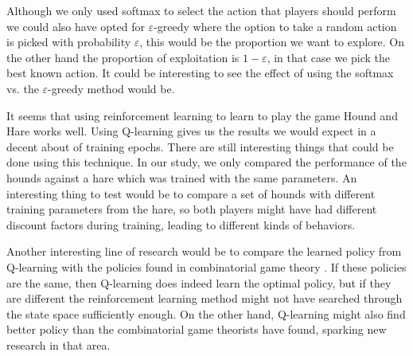 Although we only used softmax to select the action that players should perform
we could also have opted for $\varepsilon$-greedy where the option to take a
random action is picked with probability $\varepsilon$, this would be the
proportion we want to explore. On the other hand the proportion of exploitation
is $1-\varepsilon$, in that case we pick the best known action. It could be
interesting to see the effect of using the softmax vs. the $\varepsilon$-greedy
method would be.

It seems that using reinforcement learning to learn to play the game Hound and
Hare works well. Using Q-learning gives us the results we would expect in
a decent about of training epochs. There are still interesting things that
could be done using this technique. In our study, we only compared the
performance of the hounds against a hare which was trained with the same
parameters. An interesting thing to test would be to compare a set of
hounds with different training parameters from the hare, so both players
might have had different discount factors during training, leading to
different kinds of behaviors.

Another interesting line of research would be to compare the learned policy
from Q-learning with the policies found in combinatorial game theory
\cite{gardner1961second, siegel2005coping}. If these policies are the same,
then Q-learning does indeed learn the optimal policy, but if they are
different the reinforcement learning method might not have searched through
the state space sufficiently enough. On the other hand, Q-learning might
also find better policy than the combinatorial game theorists have found,
sparking new research in that area.
